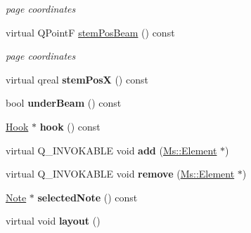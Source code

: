 \begin{DoxyCompactItemize}
\begin{DoxyCompactList}\small\item\em page coordinates \end{DoxyCompactList}\item 
\mbox{\label{class_ms_1_1_chord_a1a22e75d9714f13d9d1f2c3aee740abb}} 
virtual Q\+PointF \hyperlink{class_ms_1_1_chord_a1a22e75d9714f13d9d1f2c3aee740abb}{stem\+Pos\+Beam} () const
\begin{DoxyCompactList}\small\item\em page coordinates \end{DoxyCompactList}\item 
\mbox{\label{class_ms_1_1_chord_a52e395a780ce68723a6a3bfda2841aa3}} 
virtual qreal {\bfseries stem\+PosX} () const
\item 
\mbox{\label{class_ms_1_1_chord_ab55444ce64fe9284fb906079d80e506c}} 
bool {\bfseries under\+Beam} () const
\item 
\mbox{\label{class_ms_1_1_chord_afa6b543d5f66f5e9c6b216bddf9c4afd}} 
\hyperlink{class_ms_1_1_hook}{Hook} $\ast$ {\bfseries hook} () const
\item 
\mbox{\label{class_ms_1_1_chord_a0c4268ae4c158ece2397e7584094d038}} 
virtual Q\+\_\+\+I\+N\+V\+O\+K\+A\+B\+LE void {\bfseries add} (\hyperlink{class_ms_1_1_element}{Ms\+::\+Element} $\ast$)
\item 
\mbox{\label{class_ms_1_1_chord_a190c4d9bddd2f9acef617ec99d7af703}} 
virtual Q\+\_\+\+I\+N\+V\+O\+K\+A\+B\+LE void {\bfseries remove} (\hyperlink{class_ms_1_1_element}{Ms\+::\+Element} $\ast$)
\item 
\mbox{\label{class_ms_1_1_chord_ace8797d2ee2406c3c6a58f011e6b3e04}} 
\hyperlink{class_ms_1_1_note}{Note} $\ast$ {\bfseries selected\+Note} () const
\item 
\mbox{\label{class_ms_1_1_chord_ae9bb6b490be2bb2d61979cd0a95075c0}} 
virtual void {\bfseries layout} ()
\item 
\mbox{\label{class_ms_1_1_chord_ae09938e55d32b1e62c0b0c4d85dcb812}} 

\end{DoxyCompactItemize}
